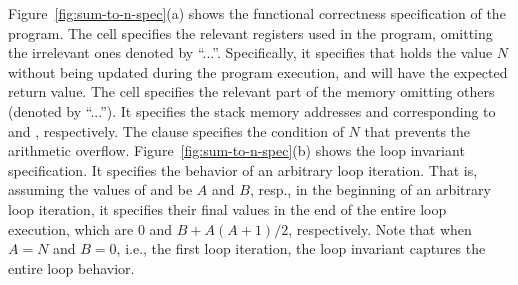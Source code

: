 Figure~\ref{fig:sum-to-n-spec}(a) shows the functional correctness specification of the  program.
The  cell specifies the relevant registers used in the program, omitting the irrelevant ones denoted by ``...''.
Specifically, it specifies that  holds the value $N$ without being updated during the program execution, and  will have the expected return value.
The  cell specifies the relevant part of the memory omitting others (denoted by ``...'').
It specifies the stack memory addresses  and  corresponding to  and , respectively.
The  clause specifies the condition of $N$ that prevents the arithmetic overflow.
%
Figure~\ref{fig:sum-to-n-spec}(b) shows the loop invariant specification.
It specifies the behavior of an arbitrary loop iteration.
That is, assuming the values of  and  be $A$ and $B$, resp., in the beginning of an arbitrary loop iteration, it specifies their final values in the end of the entire loop execution, which are 0 and $B + A(A+1)/2$, respectively.
Note that when $A = N$ and $B = 0$, i.e., the first loop iteration, the loop invariant captures the entire loop behavior.

